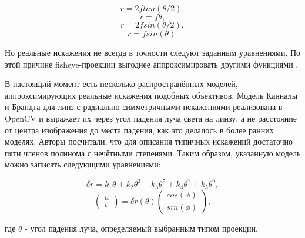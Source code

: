 \begin{eqseries}
    \begin{equation}
        \label{fy1}
    r = 2 f tan(\theta/2),  
    \end{equation}
    \begin{equation}
        \label{fy2}
    r = f \theta,
    \end{equation}
    \begin{equation}
        \label{fy3}
    r = 2 f sin(\theta/2),
    \end{equation}
    \begin{equation}
        \label{fy4}
    r = f sin(\theta).
    \end{equation}
\end{eqseries}    

Но реальные искажения не всегда в точности следуют заданным уравнениями.
По этой причине fisheye-проекции выгоднее аппроксимировать другими функциями \cite{opencv_model}.

В настоящий момент есть несколько распространённых моделей, аппроксимирующих реальные искажения подобных объективов. Модель Канналы и 
Брандта \cite{opencv_model} для линз с радиально симметричными искажениями реализована в OpenCV и выражает их через угол падения луча света на линзу, а не расстояние  
от центра изображения до места падения, как это делалось в более ранних моделях. Авторы посчитали, что для описания типичных искажений достаточно 
пяти членов полинома с нечётными степенями. Таким образом, указанную модель можно записать следующими уравнениями:
\begin{eqseries}
    \begin{equation}	
        \delta r = k_1\theta + k_2\theta^3 + k_3\theta^5 + k_4\theta^7 + k_5\theta^9,
        \label{eqn:kannala_r}
    \end{equation}
    \begin{equation}	
        \begin{pmatrix}u\\v\end{pmatrix} = \delta r(\theta)\begin{pmatrix}cos(\phi)\\sin(\phi)\end{pmatrix},
        \label{eqn:kannala_uv}
    \end{equation}
\end{eqseries}
где $\theta$ - угол падения луча, определяемый выбранным типом проекции,

